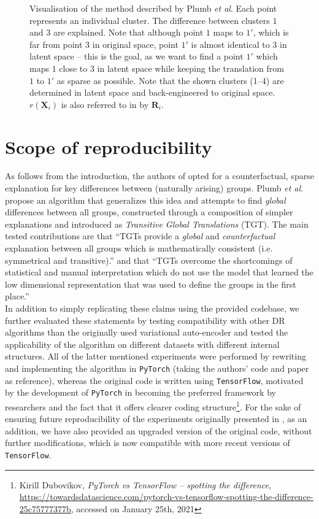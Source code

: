 \begin{figure}[h]
  \scalebox{0.8}{}
  \caption{Visualisation of the method described by Plumb \textit{et al}. Each point represents an individual cluster. The difference between clusters $1$ and $3$ are explained. Note that although point $1$ maps to $1'$, which is far from point $3$ in original space, point $1'$ is almost identical to $3$ in latent space -- this is the goal, as we want to find a point $1'$ which maps $1$ close to $3$ in latent space while keeping the translation from $1$ to $1'$ as sparse as possible. Note that the shown clusters (1--4) are determined in latent space and back-engineered to original space. $r(\boldsymbol{X}_i)$ is also referred to in \cite{plumb2020explaining} by $\boldsymbol{R}_i$.}
\end{figure}

\section{Scope of reproducibility}
As follows from the introduction, the authors of \cite{plumb2020explaining} opted for a counterfactual, sparse explanation for key differences between (naturally arising) groups. Plumb \textit{et al}. propose an algorithm that generalizes this idea and attempts to find \textit{global} differences between all groups, constructed through a composition of simpler explanations and introduced as \textit{Transitive Global Translations} (TGT). The main tested contributions are that ``TGTs provide a \textit{global} and \textit{counterfactual} explanation between all groups which is mathematically consistent (i.e. symmetrical and transitive).'' and that ``TGTs overcome the shortcomings of statistical and manual interpretation which do not use the model that learned the low dimensional representation that was used to define the groups in the first place.''\\

In addition to simply replicating these claims using the provided codebase, we further evaluated these statements by testing compatibility with other DR algorithms than the originally used variational auto-encoder and tested the applicability of the algorithm on different datasets with different internal structures. All of the latter mentioned experiments were performed by rewriting and implementing the algorithm in \texttt{PyTorch} (taking the authors' code and paper as reference), whereas the original code is written using \texttt{TensorFlow}, motivated by the development of \texttt{PyTorch} in becoming the preferred framework by researchers \cite{he2019mlframeworks} and the fact that it offers clearer coding structure\footnote{Kirill Dubovikov, \textit{PyTorch vs TensorFlow -- spotting the difference}, \url{https://towardsdatascience.com/pytorch-vs-tensorflow-spotting-the-difference-25c75777377b}, accessed on January 25th, 2021}. For the sake of ensuring future reproducibility of the experiments originally presented in \cite{plumb2020explaining}, as an addition, we have also provided an upgraded version of the original code, without further modifications, which is now compatible with more recent versions of \texttt{TensorFlow}.

